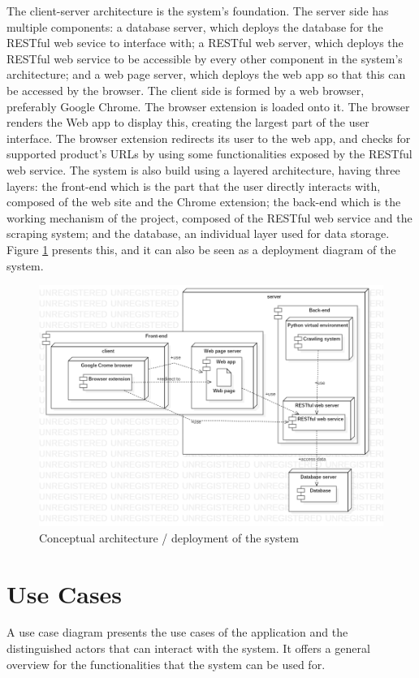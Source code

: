 \documentclass[12pt,a4paper,twoside]{report}
\begin{document}
The client-server architecture is the system's foundation. The server side has multiple components: a database server, which deploys the database for the RESTful web sevice to interface with; a RESTful web server, which deploys the RESTful web service to be accessible by every other component in the system's architecture; and a web page server, which deploys the web app so that this can be accessed by the browser. The client side is formed by a web browser, preferably Google Chrome. The browser extension is loaded onto it. The browser renders the Web app to display this, creating the largest part of the user interface. The browser extension redirects its user to the web app, and checks for supported product's URLs by using some functionalities exposed by the RESTful web service. The system is also build using a layered architecture, having three layers: the front-end which is the part that the user directly interacts with, composed of the web site and the Chrome extension; the back-end which is the working mechanism of the project, composed of the RESTful web service and the scraping system; and the database, an individual layer used for data storage. Figure \ref{fig:app_conceptual_architecture_system} presents this, and it can also be seen as a deployment diagram of the system.

\begin{figure}[ht]
  \centering
  \includegraphics[width=0.65\linewidth]{img/app_conceptual_architecture_system.png}
  \caption[]{Conceptual architecture / deployment of the system}
  \label{fig:app_conceptual_architecture_system}
\end{figure}


\section{Use Cases} \label{sec:use_case}

A use case diagram presents the use cases of the application and the distinguished actors that can interact with the system. It offers a general overview for the functionalities that the system can be used for.
\end{document}

